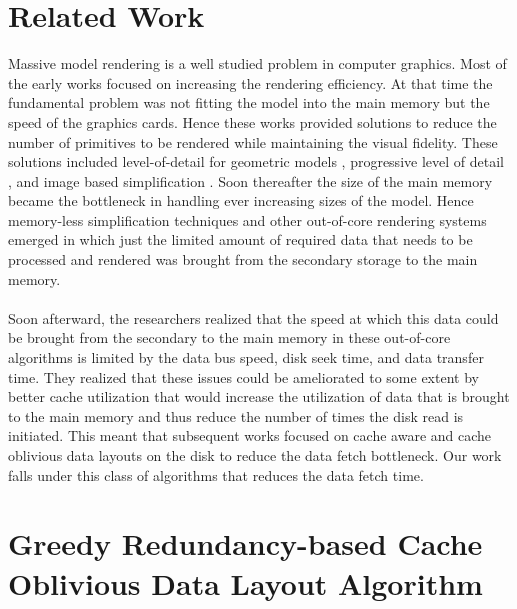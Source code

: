 \documentclass[conference]{acmsiggraph}
\begin{document}
\section{Related Work}

Massive model rendering is a well studied problem in computer graphics. Most of the early works focused on increasing the rendering efficiency. At that time the fundamental problem was not fitting the model into the main memory but the speed of the graphics cards. Hence these works provided solutions to reduce the number of primitives to be rendered while maintaining the visual fidelity. These solutions included level-of-detail for geometric models \cite{Luebke}, progressive level of detail \cite{Hoppe, Garland}, and image based simplification \cite{Aliaga, HansongZhang}. Soon thereafter the size of the main memory became the bottleneck in handling ever increasing sizes of the model. Hence memory-less simplification techniques \cite{Lindstrom}  and other out-of-core rendering systems \cite{Correa, Varadhan} emerged in which just the limited amount of required data that needs to be processed and rendered was brought from the secondary storage to the main memory. \\
\\
Soon afterward, the researchers realized that the speed at which this data could be brought from the secondary to the main memory in these out-of-core algorithms is limited by the data bus speed, disk seek time, and data transfer time. They realized that these issues could be ameliorated to some extent by better cache utilization that would increase the utilization of data that is brought to the main memory and thus reduce the number of times the disk read is initiated. This meant that subsequent works focused on cache aware \cite{ssdpaper} and cache oblivious data layouts \cite{Yoon, other lindstrom's works} on the disk to reduce the  data fetch bottleneck. Our work falls under this class of algorithms that reduces the data fetch time. \\

\section{Greedy Redundancy-based Cache Oblivious Data Layout Algorithm}
\end{document}

